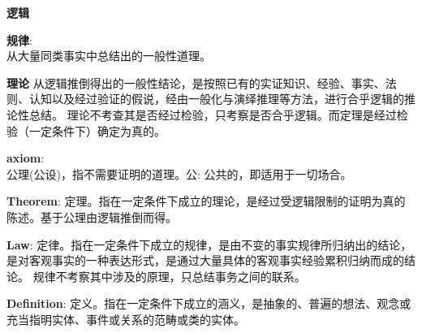 \textbf{逻辑}

\textbf{规律}:\\
    从大量同类事实中总结出的一般性道理。

\textbf{理论}
    从逻辑推倒得出的一般性结论，是按照已有的实证知识、经验、事实、法则、认知以及经过验证的假说，经由一般化与演绎推理等方法，进行合乎逻辑的推论性总结。
    理论不考查其是否经过检验，只考察是否合乎逻辑。而定理是经过检验（一定条件下）确定为真的。


\textbf{axiom}:	\\
    公理(公设)，指不需要证明的道理。公: 公共的，即适用于一切场合。

\textbf{Theorem}:
    定理。指在一定条件下成立的理论，是经过受逻辑限制的证明为真的陈述。基于公理由逻辑推倒而得。

\textbf{Law}:
    定律。指在一定条件下成立的规律，是由不变的事实规律所归纳出的结论，是对客观事实的一种表达形式，是通过大量具体的客观事实经验累积归纳而成的结论。
规律不考察其中涉及的原理，只总结事务之间的联系。

\textbf{Definition}:
    定义。指在一定条件下成立的涵义，是抽象的、普遍的想法、观念或充当指明实体、事件或关系的范畴或类的实体。
